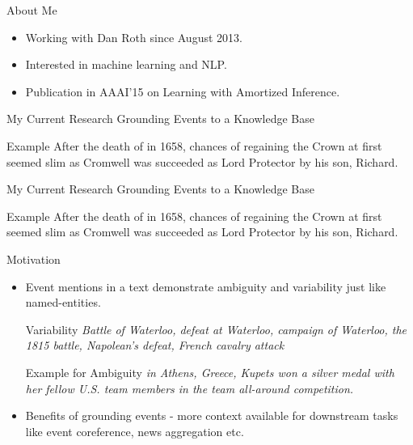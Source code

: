 \begin{frame}{About Me}
  \begin{itemize}
  \item Working with Dan Roth since August 2013.
  \item Interested in machine learning and NLP.
  \item Publication in AAAI'15 on Learning with Amortized Inference.
  \end{itemize}
\end{frame}

\begin{frame}{My Current Research}
  Grounding Events to a Knowledge Base

  \begin{block}{Example}
    After the death of  in 1658,  chances of regaining the Crown at first seemed slim as Cromwell was succeeded as Lord Protector by his son, Richard.
  \end{block}

\end{frame}

\begin{frame}{My Current Research}
  Grounding Events to a Knowledge Base

  \begin{block}{Example}
    After the {\color{blue} death of } in 1658,  chances of regaining the Crown at first seemed slim as Cromwell was succeeded as Lord Protector by his son, Richard.
  \end{block}

\end{frame}

\begin{frame}{Motivation}
  \begin{itemize}
  \item Event mentions in a text demonstrate ambiguity and variability just like named-entities.
    \begin{exampleblock}{Variability}
      \emph{Battle of Waterloo, defeat at Waterloo, campaign of Waterloo, the 1815 battle, Napolean's defeat, French cavalry attack}
    \end{exampleblock}

    \begin{exampleblock}{Example for Ambiguity}
      \emph{ in Athens, Greece, Kupets won a silver medal with her fellow U.S. team members in the team all-around competition.}
    \end{exampleblock}
  \item Benefits of grounding events - more context available for downstream tasks like event coreference, news aggregation etc.
  \end{itemize}
\end{frame}

